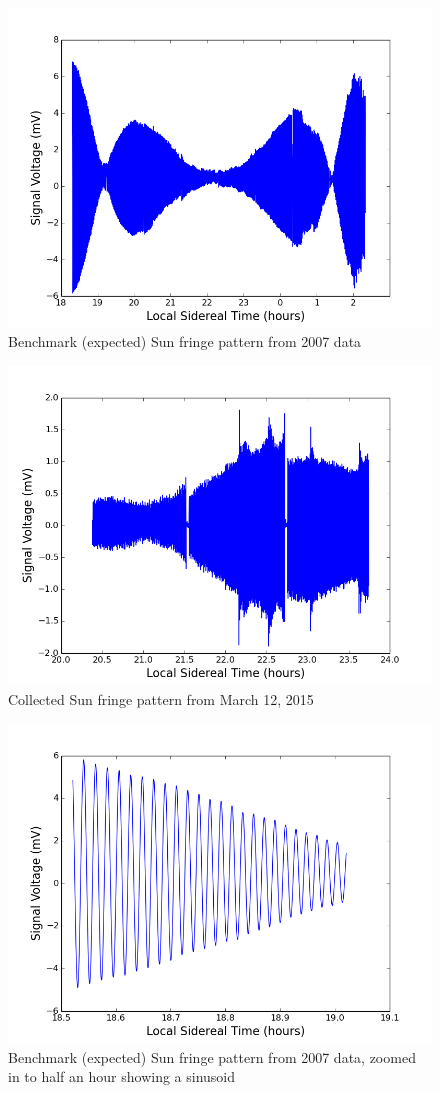 \documentclass[12pt]{article}
\begin{document}
\begin{figure}[h!]
\centering
\includegraphics[width=0.78\linewidth]{figures/sun_old_all.png}
\caption{Benchmark (expected) Sun fringe pattern from 2007 data}
\label{fig:oldsun}
\end{figure}

\begin{figure}[h!]
\centering
\includegraphics[width=0.78\linewidth]{figures/sun_new_all.png}
\caption{Collected Sun fringe pattern from March 12, 2015}
\label{fig:newsun}
\end{figure}

\begin{figure}[h!]
\centering
\includegraphics[width=0.74\linewidth]{figures/sun_old_small.png}
\caption{Benchmark (expected) Sun fringe pattern from 2007 data, zoomed in to half an hour showing a sinusoid}
\label{fig:oldsunsmall}
\end{figure}
\end{document}
